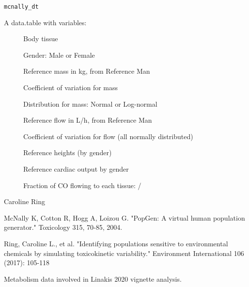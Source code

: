 \documentclass[a4paper]{book}
\begin{document}
%
\begin{Usage}
\begin{verbatim}
mcnally_dt
\end{verbatim}
\end{Usage}
%
\begin{Format}
A data.table with variables: \begin{description}
\item[] Body
tissue\item[] Gender: Male or Female
\item[] Reference mass in kg, from Reference Man
\item[] Coefficient of variation for mass
\item[] Distribution for mass: Normal or Log-normal
\item[] Reference flow in L/h, from Reference Man
\item[] Coefficient of variation for flow (all normally
distributed)\item[] Reference heights (by gender)
\item[] Reference cardiac output by gender
\item[] Fraction of CO flowing to each tissue:
/
\end{description}

\end{Format}
%
\begin{Author}\relax
Caroline Ring
\end{Author}
%
\begin{Source}\relax
McNally K, Cotton R, Hogg A, Loizou G. "PopGen: A virtual human
population generator." Toxicology 315, 70-85, 2004.
\end{Source}
%
\begin{References}\relax
Ring, Caroline L., et al. "Identifying populations sensitive to
environmental chemicals by simulating toxicokinetic variability." Environment
International 106 (2017): 105-118
\end{References}
%
\begin{Description}\relax
Metabolism data involved in Linakis 2020 vignette analysis.
\end{Description}
\end{document}
